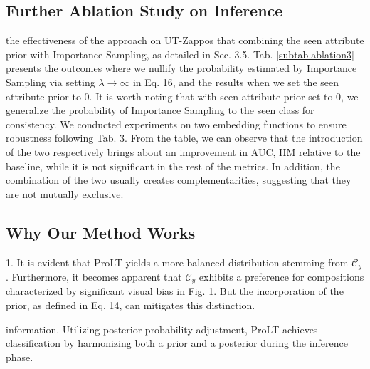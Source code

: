 \documentclass[letterpaper]{article} %
\theoremstyle{definition}
\begin{document}
\subsection{Further Ablation Study on Inference}
 the effectiveness of the approach on UT-Zappos that combining the seen attribute prior with Importance Sampling, as detailed in Sec. 3.5. Tab. \ref{subtab.ablation3} presents the outcomes where we nullify the probability estimated by Importance Sampling via setting $\lambda \rightarrow \infty $ in Eq. 16, and the results when we set the seen attribute prior to $0$. It is worth noting that with seen attribute prior set to 0, we generalize the probability of Importance Sampling to the seen class for consistency. We conducted experiments on two embedding functions to ensure robustness following Tab. 3. From the table, we can observe that the introduction of the two respectively brings about an improvement in AUC, HM relative to the baseline, while it is not significant in the rest of the metrics. In addition, the combination of the two usually creates complementarities, suggesting that they are not mutually exclusive.


\subsection{Why Our Method Works}
 1. It is evident that ProLT yields a more balanced distribution stemming from $\mathcal{C}_{y}$. Furthermore, it becomes apparent that $\mathcal{C}_y$ exhibits a preference for compositions characterized by significant visual bias in Fig. 1. But the incorporation of the prior, as defined in Eq. 14, can mitigates this distinction.

 information. Utilizing posterior probability adjustment, ProLT achieves classification by harmonizing both a prior and a posterior during the inference phase.
\end{document}
